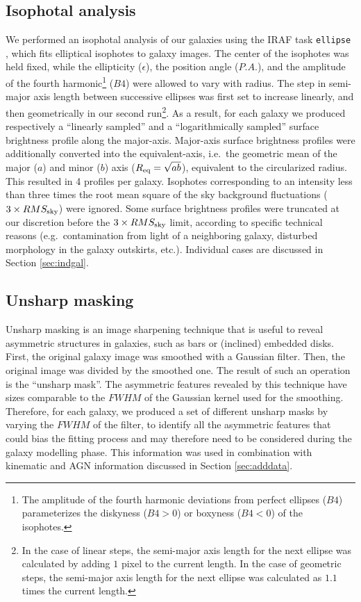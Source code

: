 \documentclass[preprint2]{emulateapj}
\begin{document}
\subsection{Isophotal analysis}
We performed an isophotal analysis of our galaxies using the IRAF task {\tt ellipse} \citep{taskellipse}, 
which fits elliptical isophotes to galaxy images.
The center of the isophotes was held fixed, while the ellipticity ($\epsilon$), the position angle ($P.A.$),  
and the amplitude of the fourth harmonic\footnote{The amplitude of the fourth harmonic deviations from perfect ellipses 
($B4$) parameterizes the diskyness ($B4>0$) or boxyness ($B4<0$) of the isophotes.} ($B4$) were allowed to vary with radius.
The step in semi-major axis length between successive ellipses was first set to increase linearly, 
and then geometrically in our second run\footnote{In the case of linear steps, 
the semi-major axis length for the next ellipse was calculated by adding $1$ pixel to the current length.
In the case of geometric steps, the semi-major axis length for the next ellipse 
was calculated as $1.1$ times the current length.}.
As a result, for each galaxy we produced respectively a ``linearly sampled'' and a ``logarithmically sampled'' 
surface brightness profile along the major-axis. 
Major-axis surface brightness profiles were additionally converted into the equivalent-axis,
i.e.~the geometric mean of the major ($a$) and minor ($b$) axis ($R_{\rm eq} = \sqrt{ab}$), 
equivalent to the circularized radius.
This resulted in 4 profiles per galaxy.
Isophotes corresponding to an intensity less than 
three times the root mean square of the sky background fluctuations ($3 \times RMS_{\rm sky}$) were ignored.
Some surface brightness profiles were truncated at our discretion before the $3 \times RMS_{\rm sky}$ limit, 
according to specific technical reasons (e.g.~contamination from light of a neighboring galaxy, 
disturbed morphology in the galaxy outskirts, etc.).
Individual cases are discussed in Section \ref{sec:indgal}.

\subsection{Unsharp masking}
Unsharp masking is an image sharpening technique that is useful to reveal asymmetric structures in galaxies, 
such as bars or (inclined) embedded disks. 
First, the original galaxy image was smoothed with a Gaussian filter.
Then, the original image was divided by the smoothed one. 
The result of such an operation is the ``unsharp mask''. 
The asymmetric features revealed by this technique have sizes 
comparable to the $FWHM$ of the Gaussian kernel used for the smoothing.
Therefore, for each galaxy, we produced a set of different unsharp masks by varying the $FWHM$ of the filter,
to identify all the asymmetric features that could bias the fitting process 
and may therefore need to be considered during the galaxy modelling phase.
This information was used in combination with kinematic and AGN information discussed in Section \ref{sec:adddata}.
\end{document}
